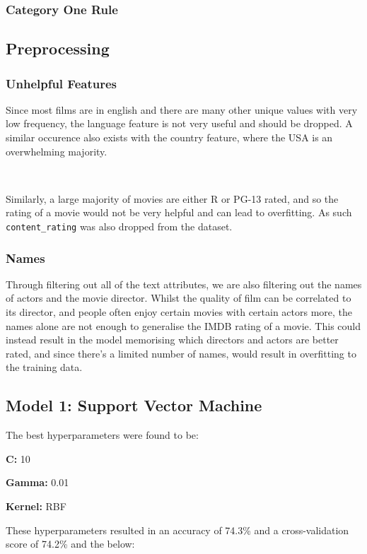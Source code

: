 \documentclass[11pt]{article}
\begin{document}
\subsubsection{Category One Rule}



\subsection{Preprocessing}

\subsubsection{Unhelpful Features}
Since most films are in english and there are many other unique values with very low frequency, the language feature is not very useful and should be dropped. A similar occurence also exists with the country feature, where the USA is an overwhelming majority. 

\ 

\noindent
Similarly, a large majority of movies are either R or PG-13 rated, and so the rating of a movie would not be very helpful and can lead to overfitting. As such \texttt{content\_rating} was also dropped from the dataset.

\subsubsection{Names}
Through filtering out all of the text attributes, we are also filtering out the names of actors and the movie director. Whilst the quality of film can be correlated to its director, and people often enjoy certain movies with certain actors more, the names alone are not enough to generalise the IMDB rating of a movie. This could instead result in the model memorising which directors and actors are better rated, and since there's a limited number of names, would result in overfitting to the training data.


\subsection{Model 1: Support Vector Machine}
The best hyperparameters were found to be:

\textbf{C: } 10

\textbf{Gamma: } 0.01

\textbf{Kernel: } RBF

\noindent
These hyperparameters resulted in an accuracy of 74.3\% and a cross-validation score of 74.2\% and the below:
\end{document}
